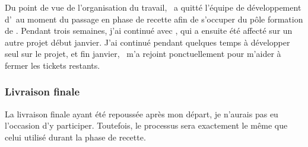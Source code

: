 Du point de vue de l'organisation du travail, \ahamon\ a quitté l'équipe de développement d'\aey\ au moment du passage en phase de recette afin de s'occuper du pôle formation de \asl. Pendant trois semaines, j'ai continué avec \aweistroff, qui a ensuite été affecté sur un autre projet début janvier. J'ai continué pendant quelques temps à développer seul sur le projet, et fin janvier, \abachelet\ m'a rejoint ponctuellement pour m'aider à fermer les tickets restants.


\subsubsection{Livraison finale}

La livraison finale ayant été repoussée après mon départ, je n'aurais pas eu l'occasion d'y participer. Toutefois, le processus sera exactement le même que celui utilisé durant la phase de recette.
